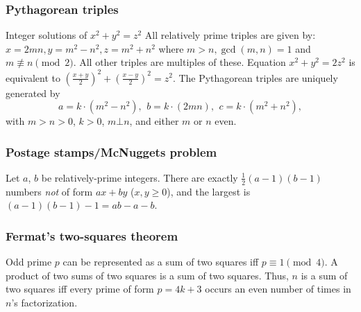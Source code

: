 \subsubsection{Pythagorean triples}
Integer solutions of $x^2 + y^2 = z^2$
All relatively prime triples are given by:
$x=2mn, y=m^2-n^2, z=m^2+n^2$ where $m>n, \gcd(m,n)=1$ and $m \not\equiv n \pmod{2}$.
All other triples are multiples of these.
Equation $x^2 + y^2 = 2z^2$ is equivalent to $(\frac{x+y}{2})^2 + (\frac{x-y}{2})^2 = z^2$.
The Pythagorean triples are uniquely generated by
\[ a=k\cdot (m^{2}-n^{2}),\ \,b=k\cdot (2mn),\ \,c=k\cdot (m^{2}+n^{2}), \]
with $m > n > 0$, $k > 0$, $m \bot n$, and either $m$ or $n$ even.

\subsubsection{Postage stamps/McNuggets problem}
Let $a$, $b$ be relatively-prime integers.
There are exactly $\frac{1}{2}(a-1)(b-1)$ numbers \emph{not} of form $ax+by$ ($x,y \ge 0$),
and the largest is $(a-1)(b-1)-1 = ab - a - b$.

\subsubsection{Fermat's two-squares theorem}
Odd prime $p$ can be represented
as a sum of two squares iff $p \equiv 1 \pmod 4$.
A product of two sums of two squares is a sum of two squares.
Thus, $n$ is a sum of two squares iff every prime of
form $p=4k+3$ occurs an even number of times in $n$'s factorization.

